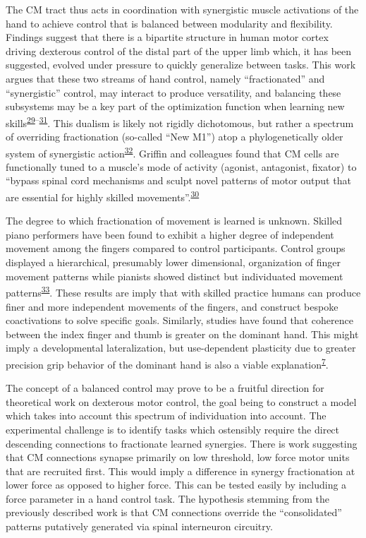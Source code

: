 \documentclass[
  a4paper,
]{article}
\begin{document}
The CM tract thus acts in coordination with synergistic muscle
activations of the hand to achieve control that is balanced between
modularity and flexibility. Findings suggest that there is a bipartite
structure in human motor cortex driving dexterous control of the distal
part of the upper limb which, it has been suggested, evolved under
pressure to quickly generalize between tasks. This work argues that
these two streams of hand control, namely ``fractionated'' and
``synergistic'' control, may interact to produce versatility, and
balancing these subsystems may be a key part of the optimization
function when learning new
skills\textsuperscript{\protect\hyperlink{ref-Rathelot2009}{29}--\protect\hyperlink{ref-Takei2017}{31}}.
This dualism is likely not rigidly dichotomous, but rather a spectrum of
overriding fractionation (so-called ``New M1'') atop a phylogenetically
older system of synergistic
action\textsuperscript{\protect\hyperlink{ref-dumCorticospinalSystemStructural2011}{32}}.
Griffin and colleagues found that CM cells are functionally tuned to a
muscle's mode of activity (agonist, antagonist, fixator) to ``bypass
spinal cord mechanisms and sculpt novel patterns of motor output that
are essential for highly skilled
movements''.\textsuperscript{\protect\hyperlink{ref-griffinCorticomotoneuronalCellsAre2015}{30}}

The degree to which fractionation of movement is learned is unknown.
Skilled piano performers have been found to exhibit a higher degree of
independent movement among the fingers compared to control participants.
Control groups displayed a hierarchical, presumably lower dimensional,
organization of finger movement patterns while pianists showed distinct
but individuated movement
patterns\textsuperscript{\protect\hyperlink{ref-furuyaFlexibilityMovementOrganization2013}{33}}.
These results are imply that with skilled practice humans can produce
finer and more independent movements of the fingers, and construct
bespoke coactivations to solve specific goals. Similarly, studies have
found that coherence between the index finger and thumb is greater on
the dominant hand. This might imply a developmental lateralization, but
use-dependent plasticity due to greater precision grip behavior of the
dominant hand is also a viable
explanation\textsuperscript{\protect\hyperlink{ref-fuglevandMechanicalPropertiesNeural2011}{7}}.

The concept of a balanced control may prove to be a fruitful direction
for theoretical work on dexterous motor control, the goal being to
construct a model which takes into account this spectrum of
individuation into account. The experimental challenge is to identify
tasks which ostensibly require the direct descending connections to
fractionate learned synergies. There is work suggesting that CM
connections synapse primarily on low threshold, low force motor units
that are recruited first. This would imply a difference in synergy
fractionation at lower force as opposed to higher force. This can be
tested easily by including a force parameter in a hand control task. The
hypothesis stemming from the previously described work is that CM
connections override the ``consolidated'' patterns putatively generated
via spinal interneuron circuitry.
\end{document}

